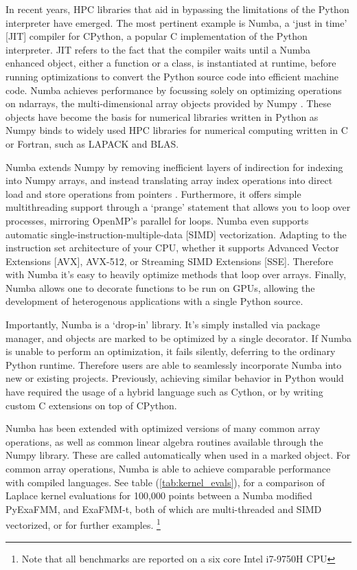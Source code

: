 \documentclass{IEEEcsmag}
\begin{document}
In recent years, HPC libraries that aid in bypassing the limitations of the Python interpreter have emerged. The most pertinent example is Numba, a `just in time' [JIT] compiler for CPython, a popular C implementation of the Python interpreter. JIT refers to the fact that the compiler waits until a Numba enhanced object, either a function or a class, is instantiated at runtime, before running optimizations to convert the Python source code into efficient machine code. Numba achieves performance by focussing solely on optimizing operations on ndarrays, the multi-dimensional array objects provided by Numpy . These objects have become the basis for numerical libraries written in Python as Numpy binds to widely used HPC libraries for numerical computing written in C or Fortran, such as LAPACK and BLAS.

Numba extends Numpy by removing inefficient layers of indirection for indexing into Numpy arrays, and instead translating array index operations into direct load and store operations from pointers \cite{Lam2015}. Furthermore, it offers simple multithreading support through a `prange' statement that allows you to loop over processes, mirroring OpenMP's parallel for loops. Numba even supports automatic single-instruction-multiple-data [SIMD] vectorization. Adapting to the instruction set architecture of your CPU, whether it supports Advanced Vector Extensions [AVX], AVX-512, or  Streaming SIMD Extensions [SSE]. Therefore with Numba it's easy to heavily optimize methods that loop over arrays. Finally, Numba allows one to decorate functions to be run on GPUs, allowing the development of heterogenous applications with a single Python source.

Importantly, Numba is a `drop-in' library. It's simply installed via package manager, and objects are marked to be optimized by a single decorator. If Numba is unable to perform an optimization, it fails silently, deferring to the ordinary Python runtime. Therefore users are able to seamlessly incorporate Numba into new or existing projects. Previously, achieving similar behavior in Python would have required the usage of a hybrid language such as Cython, or by writing custom C extensions on top of CPython.

Numba has been extended with optimized versions of many common array operations, as well as common linear algebra routines available through the Numpy library. These are called automatically when used in a marked object. For common array operations, Numba is able to achieve comparable performance with compiled languages. See table (\ref{tab:kernel_evals}), for a comparison of Laplace kernel evaluations for 100,000 points between a Numba modified PyExaFMM, and ExaFMM-t, both of which are multi-threaded and SIMD vectorized, or \cite{Lam2015} for further examples. \footnote[1]{Note that all benchmarks are reported on a six core Intel i7-9750H CPU}
\end{document}
